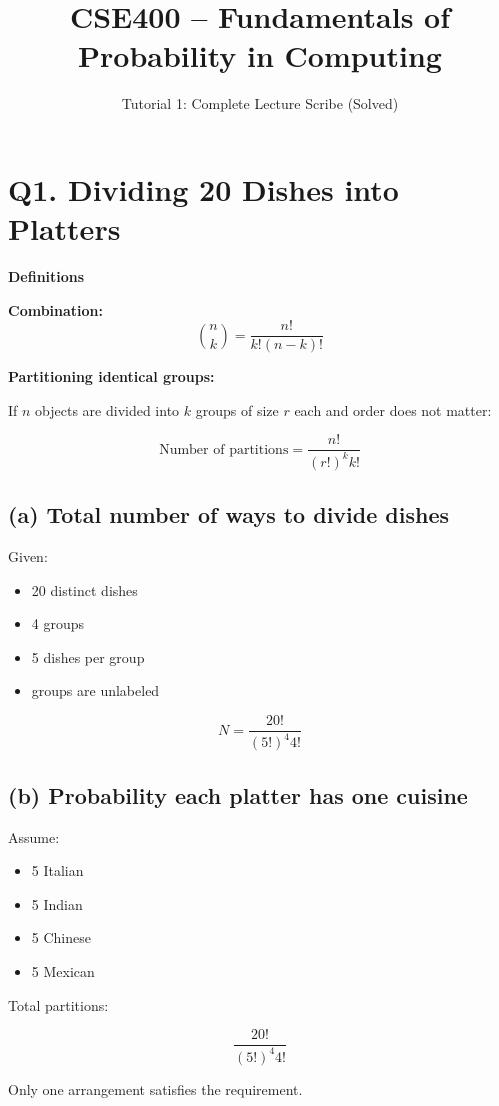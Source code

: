 \documentclass[12pt]{article}
\title{CSE400 -- Fundamentals of Probability in Computing}
\author{Tutorial 1: Complete Lecture Scribe (Solved)}
\date{}
\begin{document}
\maketitle

\section*{Q1. Dividing 20 Dishes into Platters}

\textbf{Definitions}

\textbf{Combination:}
\[
{n \choose k} = \frac{n!}{k!(n-k)!}
\]

\textbf{Partitioning identical groups:}

If $n$ objects are divided into $k$ groups of size $r$ each and order does not matter:

\[
\text{Number of partitions} = \frac{n!}{(r!)^k k!}
\]

\subsection*{(a) Total number of ways to divide dishes}

Given:

\begin{itemize}
\item 20 distinct dishes
\item 4 groups
\item 5 dishes per group
\item groups are unlabeled
\end{itemize}

\[
N = \frac{20!}{(5!)^4 4!}
\]

\subsection*{(b) Probability each platter has one cuisine}

Assume:

\begin{itemize}
\item 5 Italian
\item 5 Indian
\item 5 Chinese
\item 5 Mexican
\end{itemize}

Total partitions:

\[
\frac{20!}{(5!)^4 4!}
\]

Only one arrangement satisfies the requirement.
\end{document}
